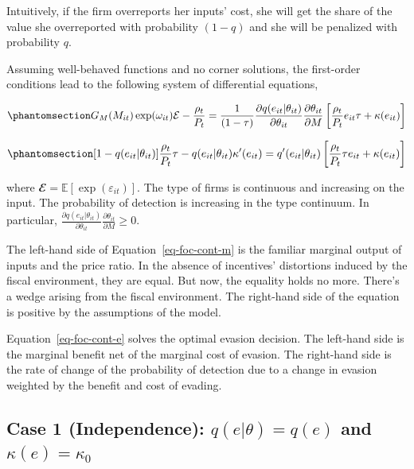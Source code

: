 \documentclass[
  12pt]{article}
\theoremstyle{definition}
\theoremstyle{remark}
\begin{document}
Intuitively, if the firm overreports her inputs' cost, she will get the
share of the value she overreported with probability \((1-q)\) and she
will be penalized with probability \(q\).

Assuming well-behaved functions and no corner solutions, the first-order
conditions lead to the following system of differential equations,

\begin{equation}\phantomsection\label{eq-foc-cont-m}{
G_M(M_{it})\exp(\omega_{it})\mathcal{E}-\frac{\rho_{t}}{P_t} = \frac{1}{(1-\tau)}\frac{\partial q(e_{it}|\theta_{it})}{\partial \theta_{it}}\frac{\partial \theta_{it}}{\partial M}\left[\frac{\rho_t}{P_t}e_{it}\tau+\kappa(e_{it})\right]
}\end{equation}

\begin{equation}\phantomsection\label{eq-foc-cont-e}{
[1-q(e_{it}|\theta_{it})]\frac{\rho_t}{P_t}\tau-q(e_{it}|\theta_{it})\kappa'(e_{it})=q'(e_{it}|\theta_{it})\left[\frac{\rho_t}{P_t}\tau e_{it} + \kappa(e_{it})\right]
}\end{equation}

where \(\mathbfcal{E}=\mathbb{E}[\exp(\varepsilon_{it})]\). The type of
firms is continuous and increasing on the input. The probability of
detection is increasing in the type continuum. In particular,
\(\frac{\partial q(e_{it}|\theta_{it})}{\partial \theta_{it}}\frac{\partial \theta_{it}}{\partial M}\ge0\).

The left-hand side of Equation~\ref{eq-foc-cont-m} is the familiar
marginal output of inputs and the price ratio. In the absence of
incentives' distortions induced by the fiscal environment, they are
equal. But now, the equality holds no more. There's a wedge arising from
the fiscal environment. The right-hand side of the equation is positive
by the assumptions of the model.

Equation~\ref{eq-foc-cont-e} solves the optimal evasion decision. The
left-hand side is the marginal benefit net of the marginal cost of
evasion. The right-hand side is the rate of change of the probability of
detection due to a change in evasion weighted by the benefit and cost of
evading.

\subsection{\texorpdfstring{Case 1 (Independence): \(q(e|\theta)=q(e)\)
and
\(\kappa(e)=\kappa_0\)}{Case 1 (Independence): q(e\textbar\textbackslash theta)=q(e) and \textbackslash kappa(e)=\textbackslash kappa\_0}}\label{case-1-independence-qethetaqe-and-kappaekappa_0}
\end{document}
